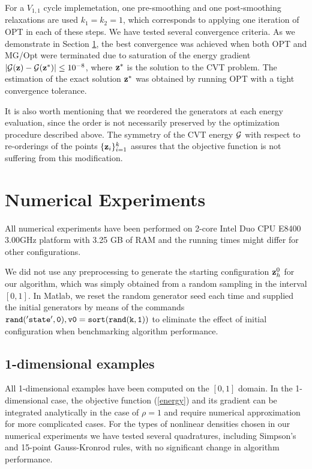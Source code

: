 \documentclass{siamltex}
\begin{document}
For a $V_{1,1}$ cycle implemetation, one pre-smoothing and one post-smoothing relaxations are used $k_1=k_2=1$, which corresponds to applying one iteration of OPT in each of these steps. We have tested several convergence criteria. As we demonstrate in Section \ref{num}, the best convergence was achieved when both OPT and MG/Opt were terminated due to saturation of the energy gradient $|\cg(\bz)-\cg(\bz^{*})| \le 10^{-8}$, where ${\bf z}^{*}$ is the solution to the CVT problem.  The estimation of the exact solution ${\bf z}^{*}$ was obtained by running OPT with a tight convergence tolerance.

It is also worth mentioning that we reordered the generators at each energy evaluation, since the order is not necessarily preserved by the optimization procedure described above. The symmetry of the CVT energy $\cg$ with respect to re-orderings of the points $\{{{\bf z}}_i\}_{i=1}^k$ assures that the objective function is not suffering from this modification.

\section{Numerical Experiments}
\label{num}

All numerical experiments have been performed on 2-core Intel Duo CPU E8400 3.00GHz platform with 3.25 GB of RAM and the running times might differ for other configurations.

We did not use any preprocessing to generate the starting configuration ${\bf z}_h^0$ for our algorithm, which was simply obtained from a random sampling in the interval $[0,1]$. In Matlab, we reset the random generator seed each time and supplied the initial generators by means of the commands $\tt{rand('state',0), v0=sort(rand(k,1))}$ to eliminate the effect of initial configuration when benchmarking algorithm performance.

\subsection{1-dimensional examples}

All 1-dimensional examples have been computed on the $[0,1]$ domain. In the 1-dimensional case, the objective function (\ref{energy}) and its gradient can be integrated analytically in the case of $\rho=1$ and require numerical approximation for more complicated cases. For the types of nonlinear densities chosen in our numerical experiments we have tested several quadratures, including Simpson's and 15-point Gauss-Kronrod rules, with no significant change in algorithm performance.
\end{document}
